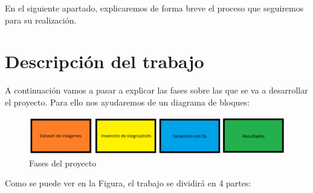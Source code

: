 \documentclass[12pt,oneside,a4paper]{article}
\begin{document}
En el siguiente apartado, explicaremos de forma breve el proceso que seguiremos para su realización.





\section{Descripción del trabajo}

A continuación vamos a pasar a explicar las fases sobre las que se va a desarrollar el proyecto. Para ello nos ayudaremos de un diagrama de bloques:

\begin{figure}[h]
  \centering
  \includegraphics[width=16cm]{Descripcion_Trabajo.eps}
  \caption{Fases del proyecto}
  \label{fig:diagrama_bloques}
\end{figure}

Como se puede ver en la Figura, el trabajo se dividirá en 4 partes:
\end{document}

